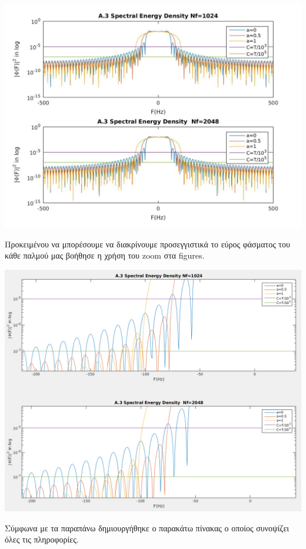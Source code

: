 \documentclass[11pt]{article}
\begin{document}
    \begin{center}
        \includegraphics[scale=0.35]{photos/A.3 Bandwidth.jpg}
    \end{center} 
    
    Προκειμένου να μπορέσουμε να διακρίνουμε προσεγγιστικά το εύρος φάσματος του κάθε παλμού μας βοήθησε η χρήση του zoom στα figures. 
    
    \begin{center}
        \includegraphics[scale=0.35]{photos/A.3 Bandwidth zoom.png}
    \end{center} 
    
    Σύμφωνα με τα παραπάνω δημιουργήθηκε ο παρακάτω πίνακας ο οποίος συνοψίζει όλες τις πληροφορίες.
    
\end{document}

